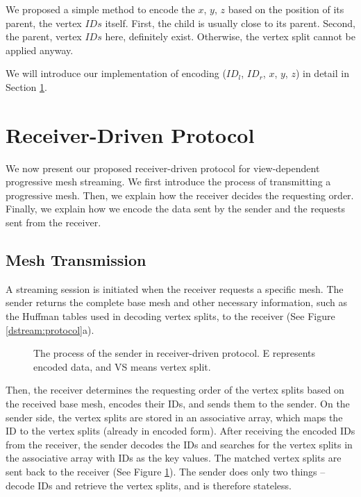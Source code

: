     We proposed a simple method to encode the $x$, $y$, $z$ based on the position
    of its parent, the vertex $IDs$ itself. First, the child is usually close to its
    parent. Second, the parent, vertex $IDs$ here, definitely exist. Otherwise, the vertex
    split cannot be applied anyway. 

    We will introduce our implementation of encoding ($ID_l$, $ID_r$, $x$, $y$, $z$) 
    in detail in Section \ref{s:dstream:protocol}.

\section{Receiver-Driven Protocol}
     \label{s:dstream:protocol}
	 We now present our proposed receiver-driven protocol
     for view-dependent progressive mesh streaming.
     We first introduce the process of transmitting 
     a progressive mesh. Then, we explain how the receiver decides the requesting order.
     Finally, we explain how we encode the data sent by the sender and the requests sent from the receiver.
     
     \subsection{Mesh Transmission} 
     A streaming session is initiated when the receiver requests a specific
     mesh.
     The sender returns the complete base mesh and other necessary information,
     such as the Huffman tables used in decoding vertex splits, to the receiver
     (See Figure \ref{dstream:protocol}a).
     
     \begin{figure}
     \centering
     \caption[The process of the sender in receiver-driven protocol.]{The process of the sender in receiver-driven protocol. 
     E represents encoded data, and VS means vertex split. \label{dstream:process}}
     \end{figure}
     Then, the receiver determines
     the requesting order of the vertex splits based on the received base mesh, 
     encodes their IDs, and
     sends them to the sender. On the sender side, the vertex splits are stored
     in an associative array, which maps the ID to the vertex splits (already in encoded form). 
     After receiving the encoded IDs from the receiver, 
     the sender decodes the IDs and searches for the vertex splits 
     in the associative array
     with IDs as the key values. The matched vertex splits
     are sent back to the receiver (See Figure \ref{dstream:process}). 
     The sender does only two things -- decode IDs and retrieve the 
     vertex splits, and is therefore stateless. 

